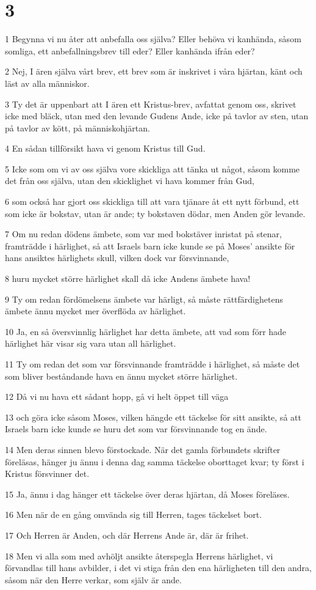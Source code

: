 \chapter{3}

\par 1 Begynna vi nu åter att anbefalla oss själva? Eller behöva vi kanhända, såsom somliga, ett anbefallningsbrev till eder? Eller kanhända ifrån eder?
\par 2 Nej, I ären själva vårt brev, ett brev som är inskrivet i våra hjärtan, känt och läst av alla människor.
\par 3 Ty det är uppenbart att I ären ett Kristus-brev, avfattat genom oss, skrivet icke med bläck, utan med den levande Gudens Ande, icke på tavlor av sten, utan på tavlor av kött, på människohjärtan.
\par 4 En sådan tillförsikt hava vi genom Kristus till Gud.
\par 5 Icke som om vi av oss själva vore skickliga att tänka ut något, såsom komme det från oss själva, utan den skicklighet vi hava kommer från Gud,
\par 6 som också har gjort oss skickliga till att vara tjänare åt ett nytt förbund, ett som icke är bokstav, utan är ande; ty bokstaven dödar, men Anden gör levande.
\par 7 Om nu redan dödens ämbete, som var med bokstäver inristat på stenar, framträdde i härlighet, så att Israels barn icke kunde se på Moses' ansikte för hans ansiktes härlighets skull, vilken dock var försvinnande,
\par 8 huru mycket större härlighet skall då icke Andens ämbete hava!
\par 9 Ty om redan fördömelsens ämbete var härligt, så måste rättfärdighetens ämbete ännu mycket mer överflöda av härlighet.
\par 10 Ja, en så översvinnlig härlighet har detta ämbete, att vad som förr hade härlighet här visar sig vara utan all härlighet.
\par 11 Ty om redan det som var försvinnande framträdde i härlighet, så måste det som bliver beståndande hava en ännu mycket större härlighet.
\par 12 Då vi nu hava ett sådant hopp, gå vi helt öppet till väga
\par 13 och göra icke såsom Moses, vilken hängde ett täckelse för sitt ansikte, så att Israels barn icke kunde se huru det som var försvinnande tog en ände.
\par 14 Men deras sinnen blevo förstockade. När det gamla förbundets skrifter föreläsas, hänger ju ännu i denna dag samma täckelse oborttaget kvar; ty först i Kristus försvinner det.
\par 15 Ja, ännu i dag hänger ett täckelse över deras hjärtan, då Moses föreläses.
\par 16 Men när de en gång omvända sig till Herren, tages täckelset bort.
\par 17 Och Herren är Anden, och där Herrens Ande är, där är frihet.
\par 18 Men vi alla som med avhöljt ansikte återspegla Herrens härlighet, vi förvandlas till hans avbilder, i det vi stiga från den ena härligheten till den andra, såsom när den Herre verkar, som själv är ande.

